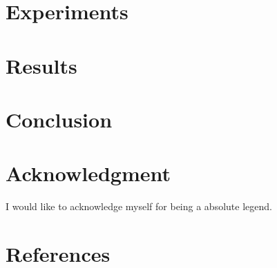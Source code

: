 \documentclass[conference]{IEEEtran}
\begin{document}
\section{Experiments}

\section{Results}

\section{Conclusion}


\section*{Acknowledgment}

I would like to acknowledge myself for being a absolute legend.

\section*{References}




\end{document}
